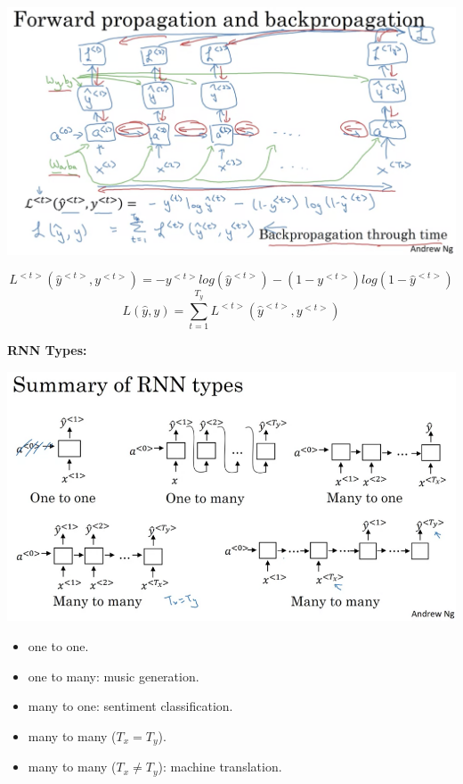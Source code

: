 \documentclass{article}
\begin{document}
\begin{center}
\includegraphics[scale=0.3]{./images/rnn_backpropagation.png}
\end{center}

\[L^{<t>}(\hat{y}^{<t>}, y^{<t>}) = -y^{<t>}log(\hat{y}^{<t>}) - (1 - y^{<t>})log(1 - \hat{y}^{<t>})\]
\[L(\hat{y}, y) = \sum_{t = 1}^{T_{y}} L^{<t>}(\hat{y}^{<t>}, y^{<t>})\]

\noindent \textbf{RNN Types:}

\begin{center}
\includegraphics[scale=0.3]{./images/rnn_types.png}
\end{center}

\begin{itemize}
    \item one to one.
    \item one to many: music generation.
    \item many to one: sentiment classification.
    \item many to many (\(T_{x} = T_{y}\)).
    \item many to many (\(T_{x} \neq T_{y}\)): machine translation.
\end{itemize}
\end{document}
